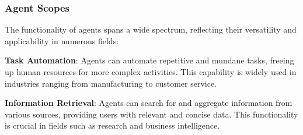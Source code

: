 
    

\subsubsection{Agent Scopes}
The functionality of agents spans a wide spectrum, reflecting their versatility and applicability in numerous fields:

\textbf{Task Automation}: Agents can automate repetitive and mundane tasks, freeing up human resources for more complex activities. This capability is widely used in industries ranging from manufacturing to customer service.

\textbf{Information Retrieval}: Agents can search for and aggregate information from various sources, providing users with relevant and concise data. This functionality is crucial in fields such as research and business intelligence.

